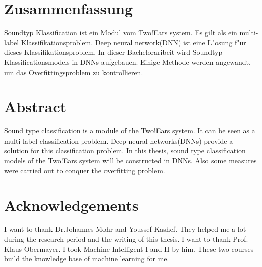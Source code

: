 \documentclass[12pt,english,german,a4paper,twoside]{report}
\begin{document}
\printnomenclature
 
\chapter*{Zusammenfassung}
Soundtyp Klassification ist ein Modul vom Two!Ears system. Es gilt als ein multi-label Klassifikationsproblem. Deep neural network(DNN) ist eine L"osung f"ur dieses Klassifikationsproblem. In dieser Bacheloraribeit wird Soundtyp Klassificationsmodels in DNNs aufgebauen. Einige Methode werden angewandt, um das Overfittingsproblem zu kontrollieren.  
\chapter*{Abstract}
Sound type classification is a module of  the Two!Ears system. It can be seen as a multi-label classification problem. Deep neural networks(DNNs) provide a solution for this classification problem. In this thesis, sound type classification models of the Two!Ears system will be constructed in DNNs. Also some measures were carried out to conquer the overfitting problem. 
\chapter*{Acknowledgements}
I want to thank Dr.Johannes Mohr and Youssef Kashef. They helped me a lot during the research period and the writing of this thesis.
I want to thank Prof. Klaus Obermayer. I took Machine Intelligent I and II by him. These two courses build the knowledge base of machine learning for me.

\cleardoublepage

\tableofcontents

\cleardoublepage


\cleardoublepage


\cleardoublepage

\cleardoublepage




\listoffigures
\listoftables



\nocite{*}
 

\end{document}
